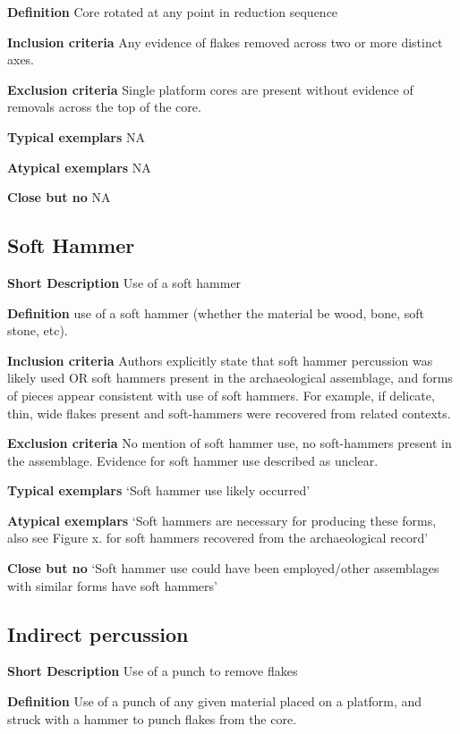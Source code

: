 \documentclass[
]{article}
\begin{document}
\textbf{Definition} Core rotated at any point in reduction sequence

\textbf{Inclusion criteria} Any evidence of flakes removed across two or
more distinct axes.

\textbf{Exclusion criteria} Single platform cores are present without
evidence of removals across the top of the core.

\textbf{Typical exemplars} NA

\textbf{Atypical exemplars} NA

\textbf{Close but no} NA

\hypertarget{soft-hammer}{%
\subsection{Soft Hammer}\label{soft-hammer}}

\textbf{Short Description} Use of a soft hammer

\textbf{Definition} use of a soft hammer (whether the material be wood,
bone, soft stone, etc).

\textbf{Inclusion criteria} Authors explicitly state that soft hammer
percussion was likely used OR soft hammers present in the archaeological
assemblage, and forms of pieces appear consistent with use of soft
hammers. For example, if delicate, thin, wide flakes present and
soft-hammers were recovered from related contexts.

\textbf{Exclusion criteria} No mention of soft hammer use, no
soft-hammers present in the assemblage. Evidence for soft hammer use
described as unclear.

\textbf{Typical exemplars} `Soft hammer use likely occurred'

\textbf{Atypical exemplars} `Soft hammers are necessary for producing
these forms, also see Figure x. for soft hammers recovered from the
archaeological record'

\textbf{Close but no} `Soft hammer use could have been employed/other
assemblages with similar forms have soft hammers'

\hypertarget{indirect-percussion}{%
\subsection{Indirect percussion}\label{indirect-percussion}}

\textbf{Short Description} Use of a punch to remove flakes

\textbf{Definition} Use of a punch of any given material placed on a
platform, and struck with a hammer to punch flakes from the core.
\end{document}
